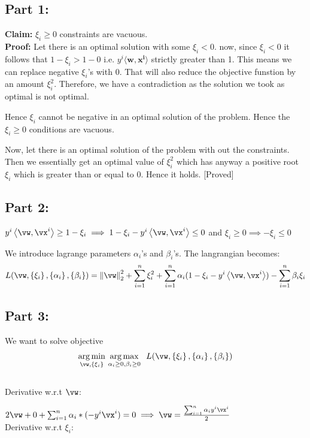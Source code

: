 \documentclass[a4paper,11pt]{article}
\begin{document}
\begin{mlsolution}
\subsection*{Part 1:}
\textbf{Claim:} $\xi_i \geq 0$ constraints are vacuous. \\
\textbf{Proof:} Let there is an optimal solution with some $\xi_i < 0$. now, since $\xi_i < 0 $ it follows that $1-\xi_i > 1 - 0$ i.e. $y^i\langle \mathbf{w,x^i} \rangle$ strictly greater than 1. This means we can replace negative $\xi_i$'s with 0. That will also reduce the objective funstion by an amount $\xi_i^2$. Therefore, we have a contradiction as the solution we took as optimal is not optimal.

Hence $\xi_i$ cannot be negative in an optimal solution of the problem. Hence the $\xi_i \geq 0$ conditions are vacuous. 

Now, let there is an optimal solution of the problem with out the constraints. Then we essentially get an optimal value of $\xi_i^2$ which has anyway a positive root $\xi_i$ which is greater than or equal to 0. Hence it holds. [Proved]

\subsection{Part 2:}
	$y^i\ip{\vw}{\vx^i} \geq 1 - \xi_i \implies 1 - \xi_i - y^i\ip{\vw}{\vx^i} \leq 0$
	and $\xi_i \geq 0
	\implies -\xi_i \leq 0$

We introduce lagrange parameters $\alpha_i$'s and $\beta_i$'s. The langrangian becomes:
$$ L(\vw,\bc{\xi_i}, \bc{\alpha_i}, \bc{\beta_i}) = \norm{\vw}_2^2 + \sum_{i=1}^n\xi_i^2 + \sum_{i=1}^n \alpha_i(1 - \xi_i - y^i\ip{\vw}{\vx^i}) - \sum_{i=1}^{n}\beta_i\xi_i $$
					
\subsection{Part 3:}
We want to solve objective $$\underset{\vw,\bc{\xi_i}}{\arg\min}\ \underset{\alpha_i \geq 0, \beta_i \geq 0}{\arg\max}\ \ L(\vw,\bc{\xi_i}, \bc{\alpha_i}, \bc{\beta_i})$$\\
Derivative w.r.t $\vw$:

	$2\vw + 0 + \sum_{i=1}^{n} \alpha_i * (-y^i\vx^i) = 0
	\implies \vw = \frac{\sum_{i=1}^{n} \alpha_iy^i\vx^i}{2}$\\
Derivative w.r.t $\xi_i$:


\end{mlsolution}
\end{document}
